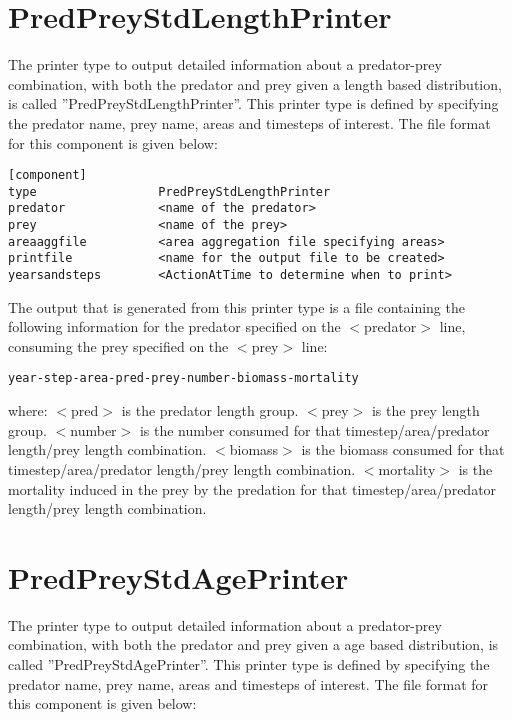 \documentclass [a4paper, 10pt]{book}
\begin{document}
\section{PredPreyStdLengthPrinter}\label{sec:predpreystdlengthprinter}
The printer type to output detailed information about a predator-prey combination, with both the predator and prey given a length based distribution, is called ''PredPreyStdLengthPrinter''.  This printer type is defined by specifying the predator name, prey name, areas and timesteps of interest.  The file format for this component is given below:

\begin{verbatim}
[component]
type                 PredPreyStdLengthPrinter
predator             <name of the predator>
prey                 <name of the prey>
areaaggfile          <area aggregation file specifying areas>
printfile            <name for the output file to be created>
yearsandsteps        <ActionAtTime to determine when to print>
\end{verbatim}

The output that is generated from this printer type is a file containing the following information for the predator specified on the $<$predator$>$ line, consuming the prey specified on the $<$prey$>$ line:

\begin{verbatim}
year-step-area-pred-prey-number-biomass-mortality
\end{verbatim}

where:\newline
$<$pred$>$ is the predator length group.\newline
$<$prey$>$ is the prey length group.\newline
$<$number$>$ is the number consumed for that timestep/area/predator length/prey length combination.\newline
$<$biomass$>$ is the biomass consumed for that timestep/area/predator length/prey length combination.\newline
$<$mortality$>$ is the mortality induced in the prey by the predation for that timestep/area/predator length/prey length combination.

\section{PredPreyStdAgePrinter}\label{sec:predpreystdageprinter}
The printer type to output detailed information about a predator-prey combination, with both the predator and prey given a age based distribution, is called ''PredPreyStdAgePrinter''.  This printer type is defined by specifying the predator name, prey name, areas and timesteps of interest.  The file format for this component is given below:
\end{document}
